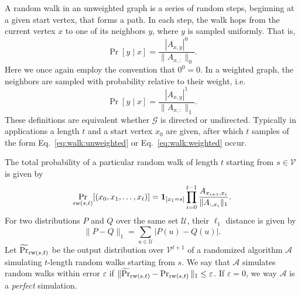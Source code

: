 \documentclass[10]{report}
\begin{document}
A random walk in an unweighted graph is a series of random steps, beginning at a given start vertex, that forms a path.
In each step, the walk hops from the current vertex $x$ to one of its neighbors $y$, where $y$ is sampled uniformly.
That is,  
%
\begin{equation} \label{eq:walk:unweighted}
	\Pr [ y \mid x] = \frac{|A_{x,y}|^0}{\|A_{x,:}\|_0}.
\end{equation}
%
Here we once again employ the convention that $0^0 = 0$.
In a weighted graph, the neighbors are sampled with probability relative to their weight, i.e. 
%
\begin{equation} \label{eq:walk:weighted}
	\Pr [ y \mid x] =  \frac{|A_{x,y}|^1}{\|A_{x,:}\|_1}.
\end{equation}
%
These definitions are equivalent whether $\mathcal{G}$ is directed or undirected.
Typically in applications a length $t$ and a start vertex $x_0$ are given, after which $t$ samples of the form Eq.~\eqref{eq:walk:unweighted} or Eq.~\ref{eq:walk:weighted} occur.

The total probability of a particular random walk of length $t$ starting from $s \in \mathcal{V}$ is given by 
%
\begin{equation} \label{eq:walk:prob}
\Pr_{\textnormal{rw}(s,t)} [(x_0, x_1, \dots, x_t)] = \mathbf{1}_{[x_1 = s]} \prod\limits_{i = 0}^{t-1} \frac{A_{x_{i+1}, x_i}}{\|A_{:,x_i}\|_1}.
\end{equation}
%
For two distributions $P$ and $Q$ over the same set $\mathcal{U}$, their $\ell_1$ distance is given by
%
\begin{equation} \label{eq:distribution:distance}
\|P - Q\|_1 = \sum_{u \in \mathcal{U}} | P(u) - Q(u)|.
\end{equation}
%
Let $\widetilde{\Pr}_{\textnormal{rw}(s,t)}$  be the output distribution over $\mathcal{V}^{t+1}$ of a randomized algorithm $\mathcal{A}$ simulating $t$-length random walks starting from $s$.
We say that $\mathcal{A}$  simulates random walks within error $\varepsilon$ if $\|\widetilde{\Pr}_{\textnormal{rw}(s,t)} - \Pr_{\textnormal{rw}(s,t)}\|_1 \leq \varepsilon$.
If $\varepsilon = 0$, we way $\mathcal{A}$ is a \emph{perfect} simulation.
\end{document}
